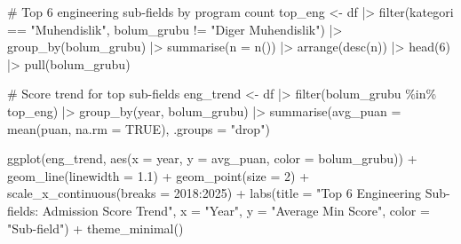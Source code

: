 \documentclass[
  11pt,
  a4paper,
  DIV=11,
  numbers=noendperiod]{scrartcl}
\newenvironment{Shaded}{\begin{snugshade}}{\end{snugshade}}
\newcommand{\AttributeTok}[1]{\textcolor[rgb]{0.40,0.45,0.13}{#1}}
\newcommand{\CommentTok}[1]{\textcolor[rgb]{0.37,0.37,0.37}{#1}}
\newcommand{\ConstantTok}[1]{\textcolor[rgb]{0.56,0.35,0.01}{#1}}
\newcommand{\DecValTok}[1]{\textcolor[rgb]{0.68,0.00,0.00}{#1}}
\newcommand{\FloatTok}[1]{\textcolor[rgb]{0.68,0.00,0.00}{#1}}
\newcommand{\FunctionTok}[1]{\textcolor[rgb]{0.28,0.35,0.67}{#1}}
\newcommand{\NormalTok}[1]{\textcolor[rgb]{0.00,0.23,0.31}{#1}}
\newcommand{\OtherTok}[1]{\textcolor[rgb]{0.00,0.23,0.31}{#1}}
\newcommand{\SpecialCharTok}[1]{\textcolor[rgb]{0.37,0.37,0.37}{#1}}
\newcommand{\StringTok}[1]{\textcolor[rgb]{0.13,0.47,0.30}{#1}}
\begin{document}
\begin{Shaded}
\begin{Highlighting}[]
\CommentTok{\# Top 6 engineering sub{-}fields by program count}
\NormalTok{top\_eng }\OtherTok{\textless{}{-}}\NormalTok{ df }\SpecialCharTok{|\textgreater{}}
  \FunctionTok{filter}\NormalTok{(kategori }\SpecialCharTok{==} \StringTok{"Muhendislik"}\NormalTok{,}
\NormalTok{         bolum\_grubu }\SpecialCharTok{!=} \StringTok{"Diger Muhendislik"}\NormalTok{) }\SpecialCharTok{|\textgreater{}}
  \FunctionTok{group\_by}\NormalTok{(bolum\_grubu) }\SpecialCharTok{|\textgreater{}}
  \FunctionTok{summarise}\NormalTok{(}\AttributeTok{n =} \FunctionTok{n}\NormalTok{()) }\SpecialCharTok{|\textgreater{}}
  \FunctionTok{arrange}\NormalTok{(}\FunctionTok{desc}\NormalTok{(n)) }\SpecialCharTok{|\textgreater{}}
  \FunctionTok{head}\NormalTok{(}\DecValTok{6}\NormalTok{) }\SpecialCharTok{|\textgreater{}}
  \FunctionTok{pull}\NormalTok{(bolum\_grubu)}

\CommentTok{\# Score trend for top sub{-}fields}
\NormalTok{eng\_trend }\OtherTok{\textless{}{-}}\NormalTok{ df }\SpecialCharTok{|\textgreater{}}
  \FunctionTok{filter}\NormalTok{(bolum\_grubu }\SpecialCharTok{\%in\%}\NormalTok{ top\_eng) }\SpecialCharTok{|\textgreater{}}
  \FunctionTok{group\_by}\NormalTok{(year, bolum\_grubu) }\SpecialCharTok{|\textgreater{}}
  \FunctionTok{summarise}\NormalTok{(}\AttributeTok{avg\_puan =} \FunctionTok{mean}\NormalTok{(puan, }\AttributeTok{na.rm =} \ConstantTok{TRUE}\NormalTok{), }\AttributeTok{.groups =} \StringTok{"drop"}\NormalTok{)}

\FunctionTok{ggplot}\NormalTok{(eng\_trend, }\FunctionTok{aes}\NormalTok{(}\AttributeTok{x =}\NormalTok{ year, }\AttributeTok{y =}\NormalTok{ avg\_puan, }\AttributeTok{color =}\NormalTok{ bolum\_grubu)) }\SpecialCharTok{+}
  \FunctionTok{geom\_line}\NormalTok{(}\AttributeTok{linewidth =} \FloatTok{1.1}\NormalTok{) }\SpecialCharTok{+}
  \FunctionTok{geom\_point}\NormalTok{(}\AttributeTok{size =} \DecValTok{2}\NormalTok{) }\SpecialCharTok{+}
  \FunctionTok{scale\_x\_continuous}\NormalTok{(}\AttributeTok{breaks =} \DecValTok{2018}\SpecialCharTok{:}\DecValTok{2025}\NormalTok{) }\SpecialCharTok{+}
  \FunctionTok{labs}\NormalTok{(}\AttributeTok{title =} \StringTok{"Top 6 Engineering Sub{-}fields: Admission Score Trend"}\NormalTok{,}
       \AttributeTok{x =} \StringTok{"Year"}\NormalTok{, }\AttributeTok{y =} \StringTok{"Average Min Score"}\NormalTok{, }\AttributeTok{color =} \StringTok{"Sub{-}field"}\NormalTok{) }\SpecialCharTok{+}
  \FunctionTok{theme\_minimal}\NormalTok{()}
\end{Highlighting}
\end{Shaded}
\end{document}
